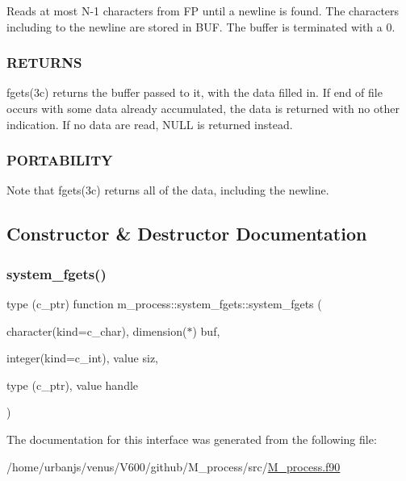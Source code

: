 Reads at most N-\/1 characters from FP until a newline is found. The characters including to the newline are stored in B\+UF. The buffer is terminated with a 0. \subsubsection*{R\+E\+T\+U\+R\+NS}

fgets(3c) returns the buffer passed to it, with the data filled in. If end of file occurs with some data already accumulated, the data is returned with no other indication. If no data are read, N\+U\+LL is returned instead. \subsubsection*{P\+O\+R\+T\+A\+B\+I\+L\+I\+TY}

Note that fgets(3c) returns all of the data, including the newline. 

\subsection{Constructor \& Destructor Documentation}
\mbox{\label{interfacem__process_1_1system__fgets_a33f5f4ba1ea0fe4e0b757d7fa5e8a571}} 
\subsubsection{\texorpdfstring{system\+\_\+fgets()}{system\_fgets()}}
{\footnotesize\ttfamily type (c\+\_\+ptr) function m\+\_\+process\+::system\+\_\+fgets\+::system\+\_\+fgets (\begin{DoxyParamCaption}\item[{character(kind=c\+\_\+char), dimension($\ast$)}]{buf,  }\item[{integer(kind=c\+\_\+int), value}]{siz,  }\item[{type (c\+\_\+ptr), value}]{handle }\end{DoxyParamCaption})\hspace{0.3cm}{\ttfamily [private]}}



The documentation for this interface was generated from the following file\+:\begin{DoxyCompactItemize}
\item 
/home/urbanjs/venus/\+V600/github/\+M\+\_\+process/src/\mbox{\hyperlink{M__process_8f90}{M\+\_\+process.\+f90}}\end{DoxyCompactItemize}
